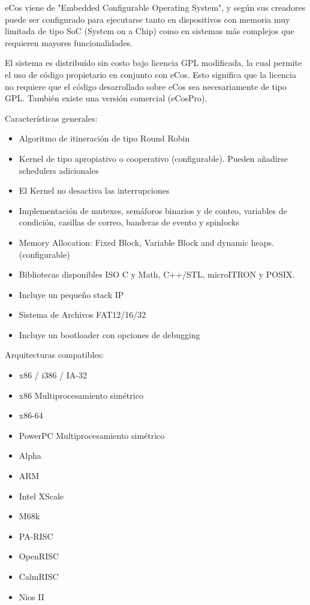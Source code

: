  eCos viene de "Embedded Configurable Operating System", y según sus creadores puede ser configurado para ejecutarse tanto en dispositivos con memoria muy limitada de tipo SoC (System on a Chip) como en sistemas más complejos que requieren mayores funcionalidades. 
 
El sistema es distribuído sin costo bajo licencia GPL modificada, la cual permite el uso de código propietario en conjunto con eCos. Esto significa que la licencia no requiere que el código desarrollado sobre eCos sea necesariamente de tipo GPL. También existe una versión comercial 
(eCosPro).

Características generales: 
				\begin{itemize}
				  	\item Algoritmo de itineración de tipo Round Robin
					\item Kernel de tipo apropiativo o cooperativo (configurable). Pueden añadirse schedulers 
 adicionales
					\item El Kernel no desactiva las interrupciones
					\item Implementación de mutexes, semáforos binarios y de conteo, variables de condición, 
 casillas de correo, banderas de evento y spinlocks
					\item Memory Allocation: Fixed Block, Variable Block and dynamic heaps. (configurable)
					\item Bibliotecas disponibles ISO C y Math, C++/STL, microITRON y POSIX. 
					\item  Incluye un pequeño stack IP
					\item Sistema de Archivos FAT12/16/32
					\item Incluye un bootloader con opciones de debugging
				\end{itemize}			

Arquitecturas compatibles:

				\begin{itemize}
				\item x86 / i386 / IA-32
				\item x86 Multiprocesamiento simétrico
				\item x86-64
				\item PowerPC Multiprocesamiento simétrico
				\item Alpha
				\item ARM
				\item Intel XScale
				\item M68k
				\item PA-RISC
				\item OpenRISC
				\item CalmRISC
				\item Nios II
			\end{itemize}			

